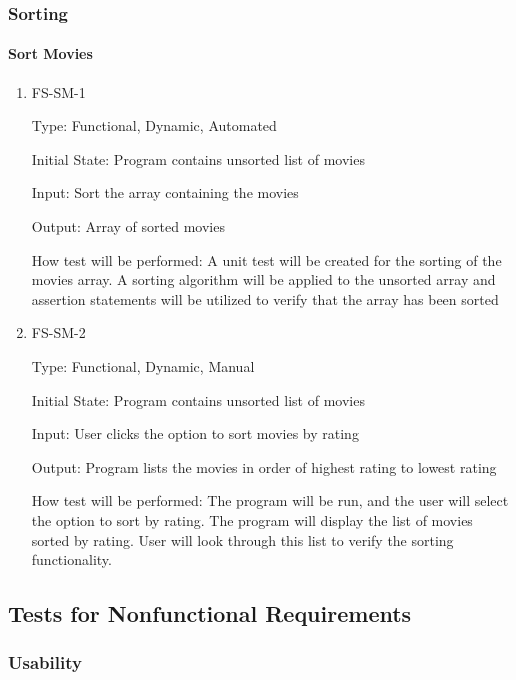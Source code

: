\documentclass[12pt, titlepage]{article}
\begin{document}
\subsubsection{Sorting}

\paragraph{Sort Movies}

\begin{enumerate}
	
	\item{FS-SM-1\\}
	
	Type: Functional, Dynamic, Automated
	
	Initial State: Program contains unsorted list of movies
	
	Input: Sort the array containing the movies
	
	Output: Array of sorted movies
	
	How test will be performed: A unit test will be created for the sorting of the movies array. A sorting algorithm will be applied to the unsorted array and assertion statements will be utilized to verify that the array has been sorted
	
	\item{FS-SM-2\\}
	
	Type: Functional, Dynamic, Manual
	
	Initial State: Program contains unsorted list of movies
	
	Input: User clicks the option to sort movies by rating
	
	Output: Program lists the movies in order of highest rating to lowest rating
	
	How test will be performed: The program will be run, and the user will select the option to sort by rating. The program will display the list of movies sorted by rating. User will look through this list to verify the sorting functionality.
	
\end{enumerate}

\subsection{Tests for Nonfunctional Requirements}

\subsubsection{Usability}
		
\end{document}
